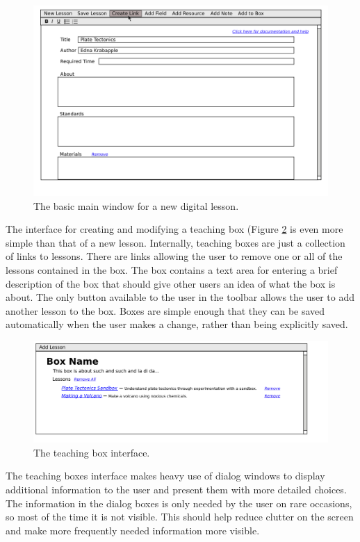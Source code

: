 \documentclass[10pt,letter]{article}
\begin{document}
\begin{figure}
	\centering
	\includegraphics[width=0.9\linewidth]{../../low-fi_prototype/button_mouseover}
	\caption{The basic main window for a new digital lesson.}
	\label{fig: main window}
\end{figure}

The interface for creating and modifying a teaching box (Figure \ref{fig: new box}
is even more simple than that of a new lesson. Internally, teaching boxes are
just a collection of links to lessons. There are links allowing the user to
remove one or all of the lessons contained in the box. The box contains a text
area for entering a brief description of the box that should give other users an
idea of what the box is about. The only button available to the user in the
toolbar allows the user to add another lesson to the box. Boxes are simple
enough that they can be saved automatically when the user makes a change, rather
than being explicitly saved.

\begin{figure}
	\centering
	\includegraphics[width=0.9\linewidth]{../../low-fi_prototype/teaching_box}
	\caption{The teaching box interface.}
	\label{fig: new box}
\end{figure}

The teaching boxes interface makes heavy use of dialog windows to display
additional information to the user and present them with more detailed choices.
The information in the dialog boxes is only needed by the user on rare
occasions, so most of the time it is not visible. This should help reduce
clutter on the screen and make more frequently needed information more visible.
\end{document}
